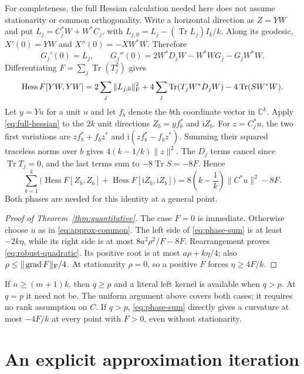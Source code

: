 \documentclass[11pt]{article}
\newcommand{\C}{\mathbb C}
\DeclareMathOperator{\Tr}{Tr}
\theoremstyle{remark}
\numberwithin{equation}{section}
\begin{document}
For completeness, the full Hessian calculation needed here does not
assume stationarity or common orthogonality. Write a horizontal direction
as $Z=YW$ and put $L_j=C_j^*W+W^*C_j$, with
$L_{j,0}=L_j-(\Tr L_j)I_k/k$. Along its geodesic,
$X'(0)=YW$ and $X''(0)=-XW^*W$. Therefore
\[
 G_j'(0)=L_j,\qquad
 G_j''(0)=2W^*D_jW-W^*WG_j-G_jW^*W.
\]
Differentiating $F=\sum_j\Tr(T_j^2)$ gives
\begin{equation}\label{eq:full-hessian}
 \operatorname{Hess}F[YW,YW]
 =2\sum_j\|L_{j,0}\|_{\rm F}^2
  +4\sum_j\Tr(T_jW^*D_jW)-4\Tr(SW^*W).
\end{equation}
Let $y=Yu$ for a unit $u$ and let $f_b$ denote the $b$th coordinate
vector in $\C^k$. Apply \eqref{eq:full-hessian} to the $2k$ unit
directions $Z_b=yf_b^*$ and $\mathrm{i}Z_b$. For $z=C_j^*u$, the
two first variations are $zf_b^*+f_bz^*$ and
$\mathrm{i}(zf_b^*-f_bz^*)$. Summing their squared traceless norms
over $b$ gives $4(k-1/k)\|z\|^2$. The $D_j$ terms cancel since
$\Tr T_j=0$, and the last terms sum to $-8\Tr S=-8F$. Hence
\begin{equation}\label{eq:phase-sum}
 \sum_{b=1}^k\bigl(\operatorname{Hess}F[Z_b,Z_b]
             +\operatorname{Hess}F[\mathrm{i}Z_b,\mathrm{i}Z_b]\bigr)
 =8\left(k-\frac1k\right)\|C^*u\|^2-8F.
\end{equation}
Both phases are needed for this identity at a general point.

\begin{proof}[Proof of Theorem~\ref{thm:quantitative}]
The case $F=0$ is immediate. Otherwise choose $u$ as in
\eqref{eq:approx-common}. The left side of \eqref{eq:phase-sum}
is at least $-2k\eta$, while its right side is at most
$8a^2\rho^2/F-8F$. Rearrangement proves
\eqref{eq:robust-quadratic}. Its positive root is at most
$a\rho+k\eta/4$; also
$\rho\le\|\operatorname{grad}F\|_{\rm F}/4$.
At stationarity $\rho=0$, so a positive $F$ forces $\eta\ge4F/k$.
\end{proof}

If $n\ge(m+1)k$, then $q\ge p$ and a literal left kernel is
available when $q>p$. At $q=p$ it need not be. The uniform argument
above covers both cases; it requires no rank assumption on $C$.
If $q>p$, \eqref{eq:phase-sum} directly gives a curvature at most
$-4F/k$ at every point with $F>0$, even without stationarity.

\section{An explicit approximation iteration}\label{sec:algorithm}
\end{document}
